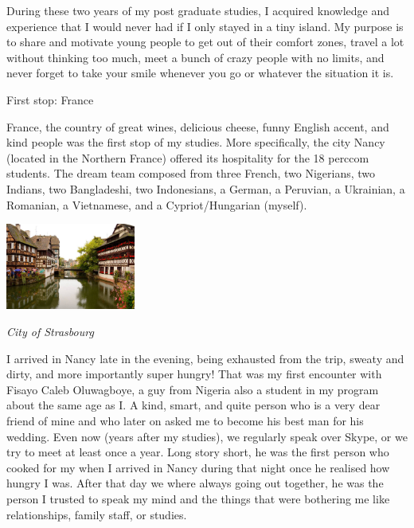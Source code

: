 \documentclass[10pt,a4paper]{article} %
\newcommand{\NewsItem}[1]{ %
\usefont{T1}{fvs}{n}{n} %
\vspace{24pt}\large #1\vspace{3pt} %
\par \normalsize \normalfont}
\begin{document}
\begin{multicols}{3}
During these two years of my post graduate studies, I acquired knowledge and 
experience that I would never had if I only stayed in a tiny island. 
My purpose is to share and motivate young people to get out of their comfort zones, 
travel a lot without thinking too much, meet a bunch of crazy people with no limits, 
and never forget to take your smile whenever you go or whatever the situation it is.

\NewsItem{First stop: France}

France, the country of great wines, delicious cheese, funny English accent, 
and kind people was the first stop of my studies. 
More specifically, the city Nancy (located in the Northern France) offered its hospitality 
for the 18 {\sc perccom} students. 
The dream team composed from three French, two Nigerians, two Indians, two Bangladeshi, two 
Indonesians, a German, a Peruvian, a Ukrainian, a Romanian, a Vietnamese, and a 
Cypriot/Hungarian (myself).  


\begin{center}
	\includegraphics[width=0.32\textwidth]{media/strasbourg.jpg}
	\par\textit{City of Strasbourg}
\end{center} 

I arrived in Nancy late in the evening, being exhausted from the trip, sweaty and 
dirty, and more importantly super hungry! 
That was my first encounter with Fisayo Caleb Oluwagboye, a guy from Nigeria also 
a student in my program about the same age as I. 
A kind, smart, and quite person who is a very dear friend of mine 
and who later on asked me to become his best man for his wedding.    
Even now (years after my studies), we regularly speak over Skype, or we try to 
meet at least once a year. 
Long story short, he was the first person who cooked for my when I arrived in Nancy 
during that night once he realised how hungry I was. 
After that day we where always going out together, he was the person I trusted to 
speak my mind and the things that were bothering me like relationships, family staff, 
or studies. 



\end{multicols}
\end{document}
